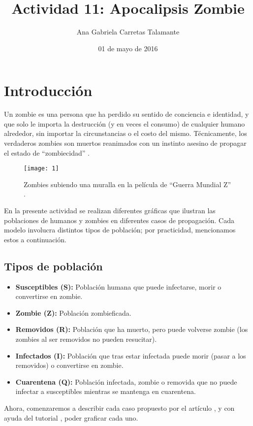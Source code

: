 \documentclass[12pt]{article}
\title{Actividad 11: Apocalipsis Zombie}
\author{Ana Gabriela Carretas Talamante}
\date{01 de mayo de 2016}
\begin{document}
\maketitle
\section{Introducción}
Un zombie es una persona que ha perdido su sentido de conciencia e identidad, y que solo le importa la destrucción (y en veces el consumo) de cualquier humano alrededor, sin importar la circunstancias o el costo del mismo. Técnicamente, los verdaderos zombies son muertos reanimados con un instinto asesino de propagar el estado de ``zombiecidad'' \cite{ZP}.

\begin{figure}[H]
\centering
 \texttt{[image: 1]}
 \caption{Zombies subiendo una muralla en la película de ``Guerra Mundial Z'' \cite{F}.}
\end{figure}

En la presente actividad se realizan diferentes gráficas que ilustran las poblaciones de humanos y zombies en diferentes casos de propagación. Cada modelo involucra distintos tipos de población; por practicidad, mencionamos estos a continuación.

\subsection{Tipos de población}
\begin{itemize}
\item \textbf{Susceptibles (S):} Población humana que puede infectarse, morir o convertirse en zombie.
\item \textbf{Zombie (Z):} Población zombieficada.
\item \textbf{Removidos (R):} Población que ha muerto, pero puede volverse zombie (los zombies al ser removidos no pueden resucitar).
\item \textbf{Infectados (I):} Población que tras estar infectada puede morir (pasar a los removidos) o convertirse en zombie.
\item \textbf{Cuarentena (Q):} Población infectada, zombie o removida que no puede infectar a susceptibles mientras se mantenga en cuarentena.
\end{itemize}

Ahora, comenzaremos a describir cada caso propuesto por el artículo \cite{Z}, y con ayuda del tutorial \cite{ZSC}, poder graficar cada uno.
\end{document}
